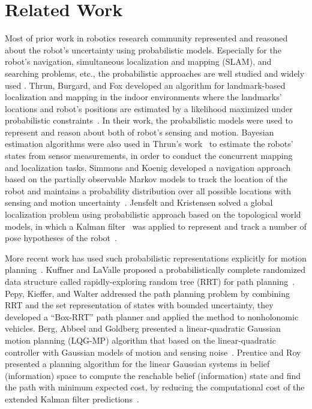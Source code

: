\section{Related Work}
\label{sec:related-cga}
Most of prior work in robotics research community represented and reasoned about
the robot's uncertainty using probabilistic models. Especially for the
robot's navigation, simultaneous localization and mapping (SLAM), and searching problems, etc.,
the probabilistic approaches are well studied and widely used \cite{ThrBurFox98,
  ThrBurFox00, ThrBurFox05,JenKri01,SimKoe95,ThrBee+00,
  TomYut01,KamManMin96}. 
Thrun, Burgard, and Fox developed an algorithm for
landmark-based localization and mapping in the indoor environments where
the landmarks' locations and robot's positions are estimated by a likelihood
maximized under probabilistic constraints~\cite{ThrBurFox98}. In their work, the
probabilistic models were used to represent and reason about both of robot's
sensing and motion. 
Bayesian estimation algorithms were also used in Thrun's
work~\cite{Thr01} to estimate the robots' states from sensor measurements,
in order to conduct the concurrent mapping and localization tasks. 
Simmons and Koenig developed a navigation approach based on the partially observable Markov models
to track the location of the robot and maintains a probability distribution over all
possible locations with sensing and motion uncertainty~\cite{SimKoe95}.
Jensfelt and Kristensen solved a global localization problem using
probabilistic approach based on the topological world models, in which a Kalman
filter~\cite{Kal60} was applied to represent and track a number of pose
hypotheses of the robot~\cite{KuiByu91}. 

More recent work has used such probabilistic representations explicitly for
motion planning~\cite{KufLav00,PepKieWal09,BerAbbGol11,PreRoy09}. 
Kuffner and LaValle proposed a probabilistically complete randomized data structure called
rapidly-exploring random tree (RRT) for path planning~\cite{KufLav00}.  
Pepy, Kieffer, and Walter addressed the path planning problem by combining RRT and the set
representation of states with bounded uncertainty, they developed a ``Box-RRT'' path
planner and applied the method to nonholonomic vehicles. 
Berg, Abbeel and Goldberg presented a linear-quadratic Gaussian motion planning (LQG-MP) algorithm that
based on the linear-quadratic controller with Gaussian models of motion and
sensing noise~\cite{BerAbbGol11}. 
Prentice and Roy presented a planning algorithm for the linear Gaussian systems in belief (information) space to compute the reachable belief (information) state and find the path with minimum
expected cost, by reducing the computational cost of the extended Kalman filter
predictions~\cite{PreRoy09}.

